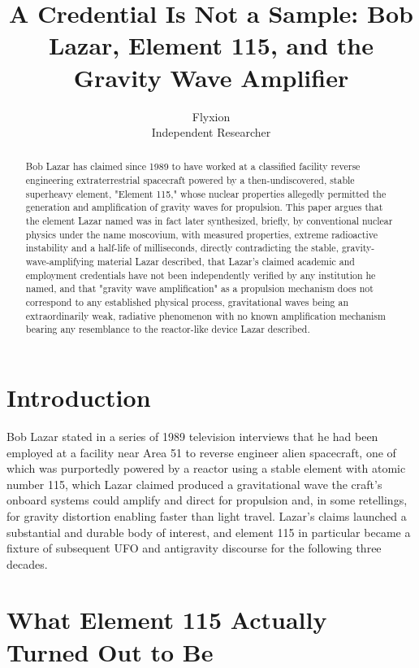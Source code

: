 \documentclass[11pt]{article}
\title{A Credential Is Not a Sample: Bob Lazar, Element 115, and the Gravity Wave Amplifier}
\author{Flyxion \\ \small Independent Researcher}
\date{}
\begin{document}
\maketitle

\begin{abstract}
Bob Lazar has claimed since 1989 to have worked at a classified facility reverse engineering extraterrestrial spacecraft powered by a then-undiscovered, stable superheavy element, "Element 115," whose nuclear properties allegedly permitted the generation and amplification of gravity waves for propulsion. This paper argues that the element Lazar named was in fact later synthesized, briefly, by conventional nuclear physics under the name moscovium, with measured properties, extreme radioactive instability and a half-life of milliseconds, directly contradicting the stable, gravity-wave-amplifying material Lazar described, that Lazar's claimed academic and employment credentials have not been independently verified by any institution he named, and that "gravity wave amplification" as a propulsion mechanism does not correspond to any established physical process, gravitational waves being an extraordinarily weak, radiative phenomenon with no known amplification mechanism bearing any resemblance to the reactor-like device Lazar described.
\end{abstract}

\section{Introduction}

Bob Lazar stated in a series of 1989 television interviews that he had been employed at a facility near Area 51 to reverse engineer alien spacecraft, one of which was purportedly powered by a reactor using a stable element with atomic number 115, which Lazar claimed produced a gravitational wave the craft's onboard systems could amplify and direct for propulsion and, in some retellings, for gravity distortion enabling faster than light travel. Lazar's claims launched a substantial and durable body of interest, and element 115 in particular became a fixture of subsequent UFO and antigravity discourse for the following three decades.

\section{What Element 115 Actually Turned Out to Be}
\end{document}
